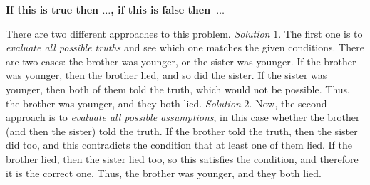 \begin{multicols}{2}
	\textbf{\color{toancuabi}If this is true then $\pmb{\ldots}$, if this is false then~$\pmb{\ldots}$}
	
	\vspace*{5pt}
	\vskip 0.2cm
	There are two different approaches to this problem.
	\vskip 0.15cm
	\textit{Solution} $1$. The first one is to \textit{evaluate all possible truths} and see which one matches the given conditions.
	There are two cases: the brother was younger, or the sister was younger.  
	\vskip 0.15cm	
	If the brother was younger, then the brother lied, and so did the sister.
	If the sister was younger, then both of them told the truth, which would not be possible.
	\vskip 0.15cm	
	Thus, the brother was younger, and they both lied.
	\vskip 0.15cm
	\textit{Solution} $2$. Now, the second approach is to \textit{evaluate all possible assumptions}, in this case whether the brother (and then the sister) told the truth.
	\vskip 0.15cm
	If the brother told the truth, then the sister did too, and
	this contradicts the condition that at least one of them lied.
	If the brother lied, then the sister lied too, so
	this satisfies the condition, and therefore it is the correct one.
	\vskip 0.15cm		
	Thus, the brother was younger, and they both lied.
	\vskip 0.2cm
	

\end{multicols}
